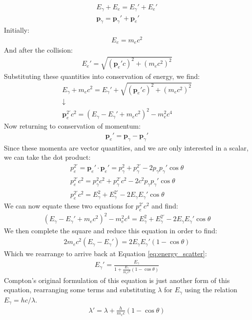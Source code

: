 \documentclass[%
 reprint,
 amsmath,amssymb,
 aps,
 pra,
]{revtex4-1}
\begin{document}
\begin{appendix}
\begin{gather}
	E_\gamma + E_e = E_\gamma ' + E_e '\nonumber \\
	\mathbf{p}_\gamma = \mathbf{p}_\gamma' + \mathbf{p}_e' \nonumber
\end{gather}
Initially:
\begin{gather}
	E_e = m_e c^2 \nonumber
\end{gather}
And after the collision:
\begin{gather}
	E_e' = \sqrt{(\mathbf{p}_e' c)^2 + (m_e c^2)^2} \nonumber
\end{gather}
Substituting these quantities into conservation of energy, we find:
\begin{gather}
	E_\gamma + m_e c^2 = E_\gamma' + \sqrt{(\mathbf{p}_e' c)^2 + (m_e c^2)^2} \nonumber \\
	\downarrow \nonumber \\
	\mathbf{p}_e^{2'} c^2  = (E_\gamma - E_\gamma' + m_e c^2)^2 - m_e^2 c^4 \nonumber
\end{gather}
Now returning to conservation of momentum:
\begin{gather}
	\mathbf{p}_e' = \mathbf{p}_\gamma - \mathbf{p}_\gamma' \nonumber
\end{gather}
Since these momenta are vector quantities, and we are only interested in a scalar, we can take the dot product:
\begin{gather}
	p_e^{2'} = \mathbf{p}_e' \cdot \mathbf{p}_e' = p_\gamma^2 + p_\gamma^{2'} - 2 p_\gamma p_\gamma' \cos{\theta} \nonumber \\
	p_e^{2'} c^2 =  p_\gamma^2 c^2 + p_\gamma^{2'} c^2 - 2 c^2 p_\gamma p_\gamma' \cos{\theta} \nonumber \\
	p_e^{2'} c^2 = E_\gamma^2 + E_\gamma^{2'} - 2 E_\gamma E_\gamma' \cos{\theta} \nonumber
\end{gather}
We can now equate these two equations for $p_e^{2'} c^2$ and find:
\begin{gather}
	(E_\gamma - E_\gamma' + m_e c^2)^2 - m_e^2 c^4 = E_\gamma^2 + E_\gamma^{2'} - 2 E_\gamma E_\gamma' \cos{\theta} \nonumber
\end{gather}
We then complete the square and reduce this equation in order to find:
\begin{gather}
	2 m_e c^2 (E_\gamma - E_\gamma') = 2 E_\gamma E_\gamma' (1- \cos{\theta}) \nonumber
\end{gather}
Which we rearrange to arrive back at Equation \ref{eq:energy_scatter}:
\begin{gather}
	E_\gamma ' = \frac{E_\gamma}{1 + \frac{E_\gamma}{m_e c^2} (1 - \cos{\theta})} \nonumber
\end{gather}
Compton's original formulation of this equation is just another form of this equation, rearranging some terms and substituting $\lambda$ for $E_\gamma$ using the relation $E_\gamma = hc/\lambda$.
\begin{gather}
	\lambda' = \lambda + \frac{h}{m_e c} (1 - \cos{\theta}) \nonumber
\end{gather}

\end{appendix}
\end{document}
